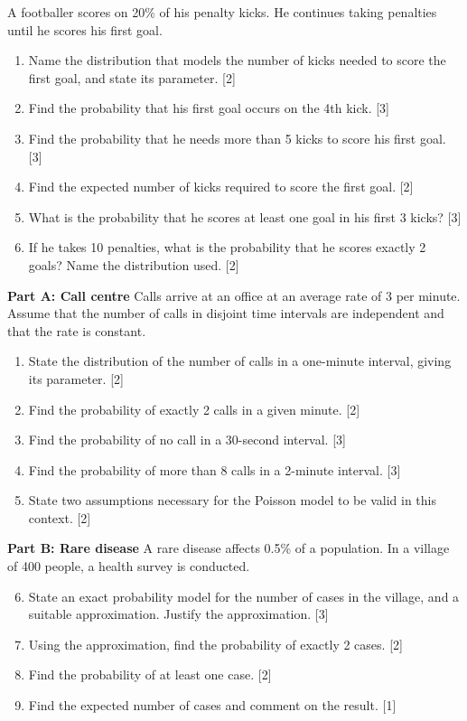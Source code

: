 \documentclass[11pt]{article}
\begin{document}
\begin{exercice}
A footballer scores on 20\% of his penalty kicks. He continues taking penalties until he scores his first goal.
\begin{enumerate}
\item Name the distribution that models the number of kicks needed to score the first goal, and state its parameter. [2]
\item Find the probability that his first goal occurs on the 4th kick. [3]
\item Find the probability that he needs more than 5 kicks to score his first goal. [3]
\item Find the expected number of kicks required to score the first goal. [2]
\item What is the probability that he scores at least one goal in his first 3 kicks? [3]
\item If he takes 10 penalties, what is the probability that he scores exactly 2 goals? Name the distribution used. [2]
\end{enumerate}
\end{exercice}

\begin{exercice}
\textbf{Part A: Call centre}
Calls arrive at an office at an average rate of 3 per minute. Assume that the number of calls in disjoint time intervals are independent and that the rate is constant.
\begin{enumerate}
\item State the distribution of the number of calls in a one-minute interval, giving its parameter. [2]
\item Find the probability of exactly 2 calls in a given minute. [2]
\item Find the probability of no call in a 30-second interval. [3]
\item Find the probability of more than 8 calls in a 2-minute interval. [3]
\item State two assumptions necessary for the Poisson model to be valid in this context. [2]
\end{enumerate}

\textbf{Part B: Rare disease}
A rare disease affects 0.5\% of a population. In a village of 400 people, a health survey is conducted.
\begin{enumerate}
\setcounter{enumi}{5}
\item State an exact probability model for the number of cases in the village, and a suitable approximation. Justify the approximation. [3]
\item Using the approximation, find the probability of exactly 2 cases. [2]
\item Find the probability of at least one case. [2]
\item Find the expected number of cases and comment on the result. [1]
\end{enumerate}
\end{exercice}
\end{document}
